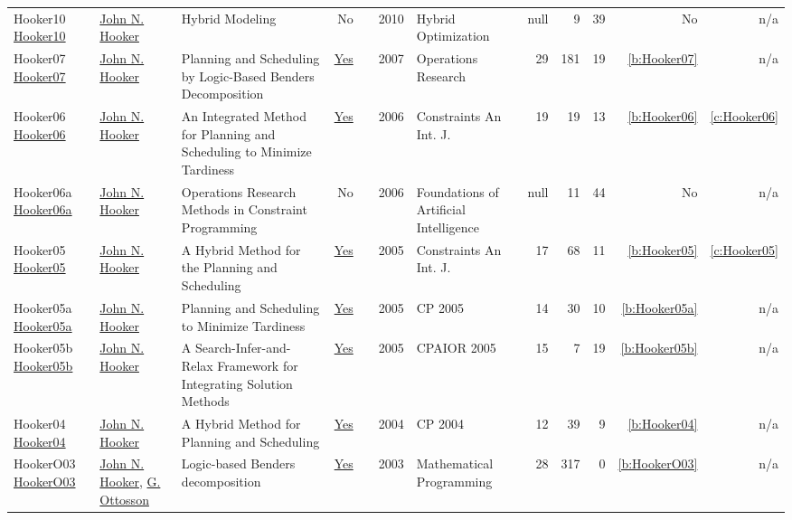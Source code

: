 {\begin{longtable}{>{\raggedright\arraybackslash}p{3cm}>{\raggedright\arraybackslash}p{6cm}>{\raggedright\arraybackslash}p{6.5cm}rrrp{2.5cm}rrrrr}
Hooker10 \href{http://dx.doi.org/10.1007/978-1-4419-1644-0_2}{Hooker10} & \hyperref[auth:a161]{John N. Hooker} & Hybrid Modeling & No & \cite{Hooker10} & 2010 & Hybrid Optimization & null & 9 & 39 & No & n/a\\
Hooker07 \href{http://dx.doi.org/10.1287/opre.1060.0371}{Hooker07} & \hyperref[auth:a161]{John N. Hooker} & Planning and Scheduling by Logic-Based Benders Decomposition & \href{../works/Hooker07.pdf}{Yes} & \cite{Hooker07} & 2007 & Operations Research & 29 & 181 & 19 & \ref{b:Hooker07} & n/a\\
Hooker06 \href{https://doi.org/10.1007/s10601-006-8060-2}{Hooker06} & \hyperref[auth:a161]{John N. Hooker} & An Integrated Method for Planning and Scheduling to Minimize Tardiness & \href{../works/Hooker06.pdf}{Yes} & \cite{Hooker06} & 2006 & Constraints An Int. J. & 19 & 19 & 13 & \ref{b:Hooker06} & \ref{c:Hooker06}\\
Hooker06a \href{http://dx.doi.org/10.1016/s1574-6526(06)80019-2}{Hooker06a} & \hyperref[auth:a161]{John N. Hooker} & Operations Research Methods in Constraint Programming & No & \cite{Hooker06a} & 2006 & Foundations of Artificial Intelligence & null & 11 & 44 & No & n/a\\
Hooker05 \href{https://doi.org/10.1007/s10601-005-2812-2}{Hooker05} & \hyperref[auth:a161]{John N. Hooker} & A Hybrid Method for the Planning and Scheduling & \href{../works/Hooker05.pdf}{Yes} & \cite{Hooker05} & 2005 & Constraints An Int. J. & 17 & 68 & 11 & \ref{b:Hooker05} & \ref{c:Hooker05}\\
Hooker05a \href{https://doi.org/10.1007/11564751_25}{Hooker05a} & \hyperref[auth:a161]{John N. Hooker} & Planning and Scheduling to Minimize Tardiness & \href{../works/Hooker05a.pdf}{Yes} & \cite{Hooker05a} & 2005 & CP 2005 & 14 & 30 & 10 & \ref{b:Hooker05a} & n/a\\
Hooker05b \href{https://doi.org/10.1007/11493853_19}{Hooker05b} & \hyperref[auth:a161]{John N. Hooker} & A Search-Infer-and-Relax Framework for Integrating Solution Methods & \href{../works/Hooker05b.pdf}{Yes} & \cite{Hooker05b} & 2005 & CPAIOR 2005 & 15 & 7 & 19 & \ref{b:Hooker05b} & n/a\\
Hooker04 \href{https://doi.org/10.1007/978-3-540-30201-8_24}{Hooker04} & \hyperref[auth:a161]{John N. Hooker} & A Hybrid Method for Planning and Scheduling & \href{../works/Hooker04.pdf}{Yes} & \cite{Hooker04} & 2004 & CP 2004 & 12 & 39 & 9 & \ref{b:Hooker04} & n/a\\
HookerO03 \href{http://dx.doi.org/10.1007/s10107-003-0375-9}{HookerO03} & \hyperref[auth:a161]{John N. Hooker}, \hyperref[auth:a859]{G. Ottosson} & Logic-based Benders decomposition & \href{../works/HookerO03.pdf}{Yes} & \cite{HookerO03} & 2003 & Mathematical Programming & 28 & 317 & 0 & \ref{b:HookerO03} & n/a\\

\end{longtable}}
